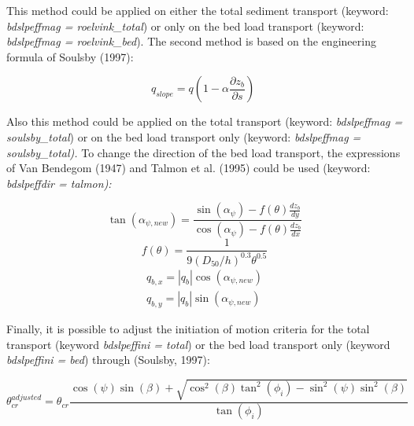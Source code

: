 \documentclass{article}
\begin{document}
\noindent This method could be applied on either the total sediment transport (keyword: \textit{bdslpeffmag = roelvink\_total}) or only on the bed load transport (keyword: \textit{bdslpeffmag = roelvink\_bed}). The second method is based on the engineering formula of Soulsby (1997):

\noindent 
\begin{equation} \label{2.105)} 
q_{slope} =q\left(1-\alpha \frac{\partial z_{b} }{\partial s} \right)\;  
\end{equation} 


\noindent Also this method could be applied on the total transport (keyword: \textit{bdslpeffmag = soulsby\_total}) or on the bed load transport only (keyword: \textit{bdslpeffmag = soulsby\_total). }To change the direction of the bed load transport, the expressions of Van Bendegom (1947) and Talmon et al. (1995) could be used (keyword: \textit{bdslpeffdir = talmon):}

\noindent 
\begin{equation} \label{2.106)} 
\tan \left(\alpha _{\psi ,new} \right)=\frac{\sin \left(\alpha _{\psi } \right)-f\left(\theta \right)\frac{dz_{b} }{dy} }{\cos \left(\alpha _{\psi } \right)-f\left(\theta \right)\frac{dz_{b} }{dx} }  
\end{equation} 
\begin{equation} \label{2.107)} 
f\left(\theta \right)=\frac{1}{9\left(D_{50} /h\right)^{0.3} \theta ^{0.5} }  
\end{equation} 
\begin{equation} \label{2.108)} 
\begin{array}{l} {q_{b,x} =\left|q_{b} \right|\cos \left(\alpha _{\psi ,new} \right)} \\ {q_{b,y} =\left|q_{b} \right|\sin \left(\alpha _{\psi ,new} \right)} \end{array} 
\end{equation} 


\noindent Finally, it is possible to adjust the initiation of motion criteria for the total transport (keyword \textit{bdslpeffini = total}) or the bed load transport only (keyword \textit{bdslpeffini = bed}) through (Soulsby, 1997):

\noindent 
\begin{equation} \label{2.109)} 
\theta _{cr}^{adjusted} =\theta _{cr} \frac{\cos \left(\psi \right)\sin \left(\beta \right)+\sqrt{\cos ^{2} \left(\beta \right)\tan ^{2} \left(\phi _{i} \right)-\sin ^{2} \left(\psi \right)\sin ^{2} \left(\beta \right)} }{\tan \left(\phi _{i} \right)}  
\end{equation} 
\end{document}

